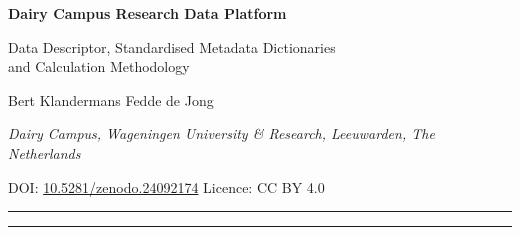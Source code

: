 \documentclass[10pt,a4paper]{article}
\begin{document}
\begin{center}
  {\sffamily\bfseries\LARGE\color{accent} Dairy Campus Research Data Platform\par}
  \vspace{4pt}
  {\sffamily\large Data Descriptor, Standardised Metadata Dictionaries\\ and Calculation Methodology\par}
  \vspace{10pt}
  {\normalsize Bert Klandermans \quad Fedde de Jong\par}
  \vspace{2pt}
  {\small\itshape Dairy Campus, Wageningen University \& Research, Leeuwarden, The Netherlands\par}
  \vspace{4pt}
  {\small DOI: \href{https://doi.org/10.5281/zenodo.24092174}{10.5281/zenodo.24092174} \quad\textbar\quad Licence: CC BY 4.0\par}
\end{center}
\vspace{6pt}
\noindent\rule{\textwidth}{0.4pt}
\begin{abstract}
\noindent
Dairy Campus (Wageningen University \& Research, Leeuwarden) maintains an experimental
dairy herd of approximately 500 Holstein Friesian dairy cows tracked continuously since 2016.
Spanning more than a decade of high-throughput precision livestock farming observations, the
platform encompasses millions of individual milking records, load-cell roughage intake visits,
enteric greenhouse gas fluxes ($\mathrm{CH}_4$, $\mathrm{CO}_2$), and laboratory milk analyses.
This data descriptor formalizes the complete research data platform: 19
distinct datasets encompassing 507 scientific variables, structured as standardized
distributions (\texttt{dct:distribution}) of a single central catalog under W3C DCAT and DataCite standards.
Derived quantities computed in the SQL layer (roughage intake, water exclusion deduction, laboratory
dry matter intake, yield-weighted milk composition, and lactation demographics) are specified in closed form.
\end{abstract}
\noindent\rule{\textwidth}{0.4pt}

\hypertarget{toc}{}
\tableofcontents
\clearpage
\end{document}
